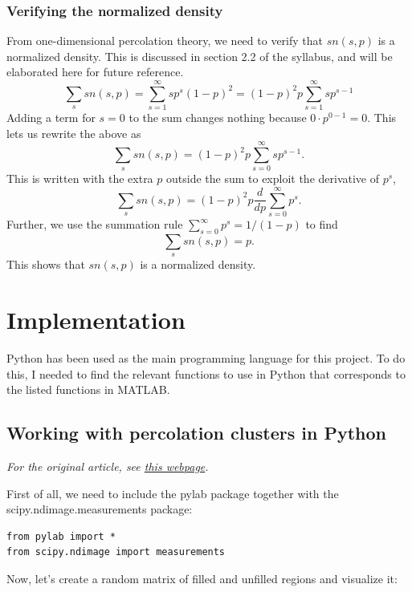\documentclass[a4paper,reprint,floatfix,amsmath,amssymb,aps,pra]{revtex4-1}
\begin{document}
\subsubsection{Verifying the normalized density}
%
From one-dimensional percolation theory, we need to verify that $sn(s,p)$ is a normalized density. This is discussed in section 2.2 of the syllabus, and will be elaborated here for future reference.
\begin{equation}
  \sum_{s} sn(s,p) = \sum_{s=1}^{\infty} sp^{s} (1-p)^{2} = (1-p)^{2} p \sum_{s = 1}^{\infty} sp^{s-1}
\end{equation} 
Adding a term for $s = 0$ to the sum changes nothing because $0 \cdot p^{0 - 1} = 0$. This lets us rewrite the above as
\begin{equation}
  \sum_{s} sn(s,p) = (1-p)^{2} p \sum_{s = 0}^{\infty} sp^{s-1}.
\end{equation} 
This is written with the extra $p$ outside the sum to exploit the derivative of $p^s$,
\begin{equation}
  \sum_{s} sn(s,p) = (1-p)^{2} p \frac{d}{dp }\sum_{s = 0}^{\infty} p^{s}.
\end{equation}
Further, we use the summation rule $\sum_{s=0}^{\infty} p^s = 1/(1-p)$ to find
\begin{equation}
  \sum_{s} sn(s,p) = p.
\end{equation}
This shows that $sn(s,p)$ is a normalized density.

\section{Implementation}

Python has been used as the main programming language for this project. To do this, I needed to find the relevant functions to use in Python that corresponds to the listed functions in MATLAB.

\subsection{Working with percolation clusters in Python}
%
\emph{For the original article, see \href{http://dragly.org/2013/03/25/working-with-percolation-clusters-in-python/}{this webpage}.}

First of all, we need to include the pylab package together with the scipy.ndimage.measurements package:
%
\begin{lstlisting}
from pylab import *
from scipy.ndimage import measurements
\end{lstlisting}
%
Now, let's create a random matrix of filled and unfilled regions and visualize it:
\end{document}
